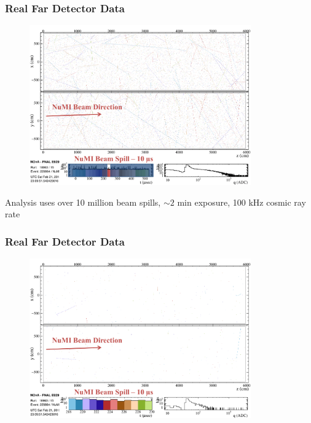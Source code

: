 \documentclass[10pt,professionalfonts,xcolor=table]{beamer}
\begin{document}
\frame
{
  \frametitle{Real Far Detector Data}

 \begin{figure} \includegraphics[width=0.85\textwidth]{figures/evd_steps/evd_beam_dir.png} \end{figure}
 \centering \footnotesize Analysis uses over 10 million beam spills, $\sim 2$ min exposure,  100 kHz cosmic ray rate
}

\frame
{
  \frametitle{Real Far Detector Data}

 \begin{figure} \includegraphics[width=0.85\textwidth]{figures/evd_steps/evd_beam_dir_nu.png} \end{figure}

 \centering \footnotesize $~$

}
\end{document}

